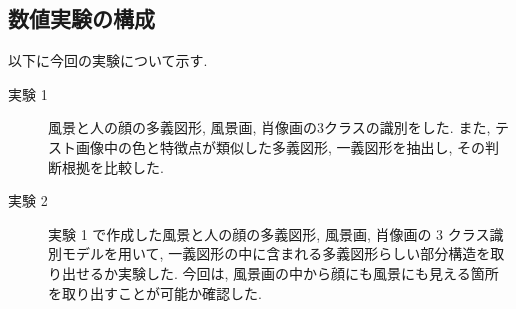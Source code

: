 \documentclass[twocolumn]{jarticle}     %
\newcommand{\1}{\mbox{1}\hspace{-0.25em}\mbox{l}}
\begin{document}
\subsection{数値実験の構成}
%
以下に今回の実験について示す.
\begin{description}
	\item[実験 1] 風景と人の顔の多義図形, 風景画, 肖像画の3クラスの識別をした. また, テスト画像中の色と特徴点が類似した多義図形, 一義図形を抽出し, その判断根拠を比較した. 
	\item[実験 2] 実験 1 で作成した風景と人の顔の多義図形, 風景画, 肖像画の 3 クラス識別モデルを用いて, 一義図形の中に含まれる多義図形らしい部分構造を取り出せるか実験した. 今回は, 風景画の中から顔にも風景にも見える箇所を取り出すことが可能か確認した. 
\end{description}

\end{document}
